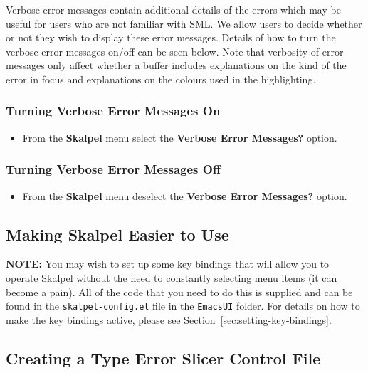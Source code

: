 \documentclass{report}
\begin{document}
Verbose error messages contain additional details of the errors which
may be useful for users who are not familiar with SML.  We allow users
to decide whether or not they wish to display these error messages.
Details of how to turn the verbose error messages on/off can be seen
below.  Note that verbosity of error messages only affect whether a
buffer includes explanations on the kind of the error in focus and
explanations on the colours used in the highlighting.

\subsubsection{Turning Verbose Error Messages On}

  \begin{itemize}
  \item From the \textbf{Skalpel}
    menu select the \textbf{Verbose Error Messages?} option.
  \end{itemize}

\subsubsection{Turning Verbose Error Messages Off}

  \begin{itemize}
  \item From the \textbf{Skalpel} menu
    deselect the \textbf{Verbose Error Messages?} option.
  \end{itemize}


\subsection{Making Skalpel Easier to Use}

\textbf{NOTE:} You may wish to set up some key bindings that will
allow you to operate Skalpel without the need to
constantly selecting menu items (it can become a pain).  All of the
code that you need to do this is supplied and can be found in the
\texttt{skalpel-config.el} file in the \texttt{EmacsUI} folder.
For details on how to make the key bindings active, please see
Section~\ref{sec:setting-key-bindings}.


\subsection{Creating a Type Error Slicer Control File}
\label{sec:skalpel-control-files}
\end{document}
